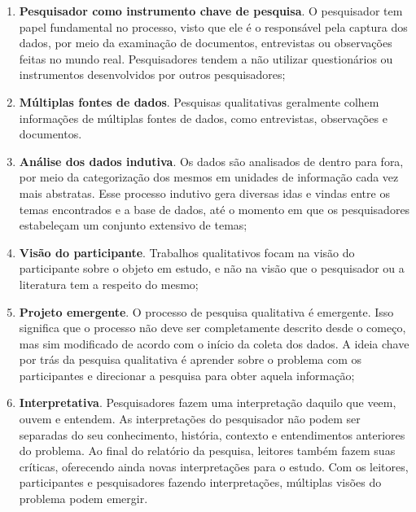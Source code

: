 \begin{enumerate}
  
  \item \textbf{Pesquisador como instrumento chave de pesquisa}. O pesquisador
  tem papel fundamental no processo, visto que ele é o responsável pela captura dos
  dados, por meio da examinação de documentos, entrevistas ou observações feitas
  no mundo real. Pesquisadores tendem a não utilizar questionários ou
  instrumentos desenvolvidos por outros pesquisadores;
  
  \item \textbf{Múltiplas fontes de dados}. Pesquisas qualitativas geralmente
  colhem informações de múltiplas fontes de dados, como entrevistas,
  observações e documentos.
  
  \item \textbf{Análise dos dados indutiva}. Os dados são analisados de dentro
  para fora, por meio da categorização dos mesmos em unidades de informação cada
  vez mais abstratas. Esse processo indutivo gera diversas idas e vindas entre
  os temas encontrados e a base de dados, até o momento em que os pesquisadores
  estabeleçam um conjunto extensivo de temas;
  
  \item \textbf{Visão do participante}. Trabalhos qualitativos focam na visão do
  participante sobre o objeto em estudo, e não na visão que o pesquisador ou a
  literatura tem a respeito do mesmo;
  
  \item \textbf{Projeto emergente}. O processo de pesquisa qualitativa é
  emergente. Isso significa que o processo não deve ser completamente descrito
  desde o começo, mas sim modificado de acordo com o início da coleta dos dados. 
  A ideia chave por trás da pesquisa qualitativa é
  aprender sobre o problema com os participantes e direcionar a pesquisa para
  obter aquela informação;
  
  \item \textbf{Interpretativa}. Pesquisadores fazem uma interpretação daquilo
  que veem, ouvem e entendem. As interpretações do pesquisador não podem ser
  separadas do seu conhecimento, história, contexto e entendimentos anteriores
  do problema. Ao final do relatório da pesquisa, leitores também fazem suas
  críticas, oferecendo ainda novas interpretações para o estudo. Com os
  leitores, participantes e pesquisadores fazendo interpretações, múltiplas
  visões do problema podem emergir.
  
\end{enumerate} 

